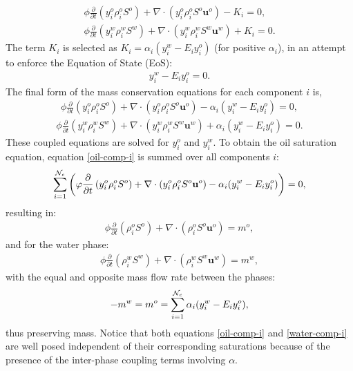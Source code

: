\begin{eqnarray}
\phi \displaystyle\frac{\partial}{\partial t}\left(y_{i}^{o}\rho_i^{o}S^{o} \right) + 
\nabla\cdot\left(y_{i}^{o}\rho_i^{o}S^{o}\mathbf{u}^{o}  \right) - K_i  = 0, \\
\phi \displaystyle\frac{\partial}{\partial t}\left(y_{i}^{w}\rho_i^{w}S^{w}  \right) + 
\nabla\cdot\left( y_{i}^{w}\rho_i^{w}S^{w}\mathbf{u}^{w}  \right) + K_i = 0. 
\end{eqnarray}
 The term $K_i$ is selected as $K_i=\alpha_i \left(y_i^w - E_i y_i^o\right)$ (for positive $\alpha_i$), in an attempt to enforce the Equation of State (EoS):
\begin{eqnarray}
y_i^w - E_i y_i^o=0. 
\label{simple-EoS}
\end{eqnarray}
The final form of the
mass conservation equations for each component $i$ is, 
\begin{eqnarray}
\phi  \displaystyle\frac{\partial}{\partial t}\left(y_{i}^{o}\rho_i^{o}S^{o} \right) + 
\nabla\cdot\left(y_{i}^{o}\rho_i^{o}S^{o}\mathbf{u}^{o}  \right) - \alpha_i (y_i^w - E_i y_i^o)  = 0 ,
\label{oil-comp-i} 
\end{eqnarray}
\begin{eqnarray}
\phi \displaystyle\frac{\partial}{\partial t}\left(y_{i}^{w}\rho_i^{w}S^{w}  \right) + 
 \nabla\cdot\left( y_{i}^{w}\rho_i^{w}S^{w}\mathbf{u}^{w}  \right) + \alpha_i (y_i^w - E_i y_i^o) = 0 . 
\label{water-comp-i}
\end{eqnarray}
These coupled equations are solved for $y_i^o$  and $y_i^w$. 
To obtain the oil saturation equation, equation \ref{oil-comp-i} is summed 
over all components $i$: 
\begin{eqnarray}
\sum\limits_{i=1}^{{\cal N}_{c}} \bigg( 
\phi \displaystyle\frac{\partial}{\partial t}\left(y_{i}^{o}\rho_i^{o}S^{o} \right) + 
\nabla\cdot\left(y_{i}^{o}\rho_i^{o}S^{o}\mathbf{u}^{o}  \right) - \alpha_i (y_i^w - E_i y_i^o)\bigg)  = 0 , 
\end{eqnarray}
resulting in: 
\begin{eqnarray}
\phi \displaystyle\frac{\partial}{\partial t}\left( \rho_i^{o} S^{o} \right) + 
\nabla\cdot\left(\rho_i^{o} S^{o}\mathbf{u}^{o}  \right) = m^{o} ,
\end{eqnarray}
and for the water phase: 
\begin{eqnarray}
\phi \displaystyle\frac{\partial}{\partial t}\left( \rho_i^{w} S^{w} \right) + 
\nabla\cdot\left(\rho_i^{w} S^{w}\mathbf{u}^{w}  \right) =m^{w} ,
\end{eqnarray}
with the equal and opposite mass flow rate between the phases: 
\begin{eqnarray}
-m^{w} = m^{o}= \sum\limits_{i=1}^{{\cal N}_{c}}\alpha_i (y_i^w - E_i y_i^o) , 
\end{eqnarray}
thus preserving mass. Notice that both equations \ref{oil-comp-i} 
and  \ref{water-comp-i} are well posed independent of 
their corresponding saturations because of the 
presence of the inter-phase coupling terms involving $\alpha$. 


